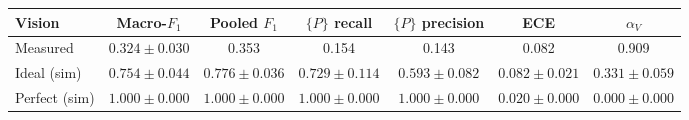 \begin{tabular}{lcccccc}
\toprule
Vision & Macro-$F_1$ & Pooled $F_1$ & $\{P\}$ recall & $\{P\}$ precision & ECE & $\alpha_V$ \\
\midrule
Measured & $0.324 \pm 0.030$ & 0.353 & 0.154 & 0.143 & 0.082 & 0.909 \\
Ideal (sim) & $0.754 \pm 0.044$ & $0.776 \pm 0.036$ & $0.729 \pm 0.114$ & $0.593 \pm 0.082$ & $0.082 \pm 0.021$ & $0.331 \pm 0.059$ \\
Perfect (sim) & $1.000 \pm 0.000$ & $1.000 \pm 0.000$ & $1.000 \pm 0.000$ & $1.000 \pm 0.000$ & $0.020 \pm 0.000$ & $0.000 \pm 0.000$ \\
\bottomrule
\end{tabular}
